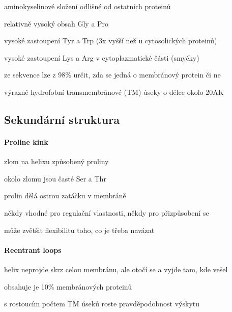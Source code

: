 \documentclass[DIV=8]{scrreprt}
\begin{document}
\begin{myItemize}[nosep]
    \item aminokyselinové složení odlišné od ostatních proteinů
\begin{myItemize}[nosep]
    \item relativně vysoký obsah Gly a Pro
    \item vysoké zastoupení Tyr a Trp (3x vyšší než u cytosolických proteinů)
    \item vysoké zastoupení Lys a Arg v cytoplazmatické části (smyčky)
\end{myItemize}

    \item ze sekvence lze z 98\% určit, zda se jedná o membránový protein či ne
    \item výrazně hydrofobní transmembránové (TM) úseky o délce okolo 20AK
\end{myItemize}



\subsection{Sekundární struktura} \label{Sekundární struktura}


\paragraph{Proline kink}
\begin{myItemize}[nosep]
    \item zlom na helixu způsobený proliny
    \item okolo zlomu jsou časté Ser a Thr
    \item prolin dělá ostrou zatáčku v membráně
\begin{myItemize}[nosep]
    \item někdy vhodné pro regulační vlastnosti, někdy pro přizpůsobení se
    \item může zvětšit flexibilitu toho, co je třeba navázat
\end{myItemize}

\end{myItemize}



\paragraph{Reentrant loops}
\begin{myItemize}[nosep]
    \item helix neprojde skrz celou membránu, ale otočí se a vyjde tam, kde vešel
    \item obsahuje je 10\% membránových proteinů
    \item s rostoucím počtem TM úseků roste pravděpodobnost výskytu
\end{myItemize}
\end{document}
